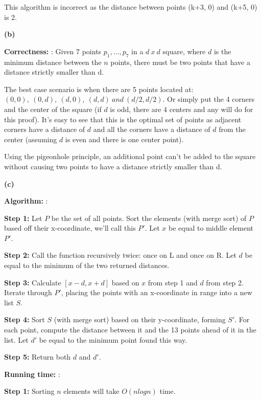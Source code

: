 \documentclass[11pt]{article}
\renewcommand\part[1]{\vspace{.10in}\textbf{(#1)}}
\newcommand\algorith{\vspace{.10in}\textbf{Algorithm: }}
\newcommand\correctness{\vspace{.10in}\textbf{Correctness: }}
\newcommand\runtime{\vspace{.10in}\textbf{Running time: }}
\begin{document}
This algorithm is incorrect as the distance between points (k+3, 0) and (k+5, 0) is 2.

\part{b} 

\correctness: Given 7 points $\mathit{p_1,...,p_7}$ in a $\mathit{d \ x \ d}$ square, where $d$ is the minimum distance between the $n$ points, there must be two points that have a distance strictly smaller than d.

	The best case scenario is when there are 5 points located at: $(0,0), \ (0,d),\ (d, 0),\  (d,d) \  and \ (d/2, d/2)$. Or simply put the 4 corners and the center of the square (if $d$ is odd, there are 4 centers and any will do for this proof). It's easy to see that this is the optimal set of points as adjacent corners have a distance of $d$ and all the corners have a distance of $d$ from the center (assuming $d$ is even and there is one center point). 
	
	Using the pigeonhole principle, an additional point can't be added to the square without causing two points to have a distance strictly smaller than d.

\part{c}

\algorith: 

\textbf{Step 1:} Let $P$ be the set of all points. Sort the elements (with merge sort) of $P$ based off their x-coordinate, we'll call this $P'$. Let $x$ be equal to middle element $P'$.

\textbf{Step 2:} Call the function recursively twice: once on L and once on R. Let $d$ be equal to the minimum of the two returned distances.

\textbf{Step 3:} Calculate $[x-d, x+d]$ based on $x$ from step 1 and $d$ from step 2. Iterate through $P'$, placing the points with an x-coordinate in range into a new list $S$.

\textbf{Step 4:} Sort $S$ (with merge sort) based on their y-coordinate, forming $S'$. For each point, compute the distance between it and the 13 points ahead of it in the list. Let $d'$ be equal to the minimum point found this way.

\textbf{Step 5:} Return both $d$ and $d'$.

\runtime:

\textbf{Step 1:} Sorting $n$ elements will take $O(nlogn)$ time.
\end{document}
